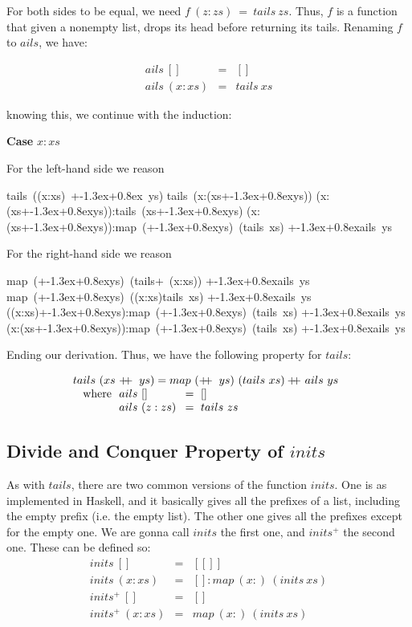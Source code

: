 \documentclass[twoside]{article}
\newcommand\concat{+\kern-1.3ex+\kern0.8ex}
\begin{document}
For both sides to be equal, we need $f~(z:zs)~=~tails~zs$. Thus, $f$ is a
function that given a nonempty list, drops its head before returning its tails.
Renaming $f$ to $ails$, we have:

\[
\begin{array}{lcl}
  ails~[]    & = & [] \\
  ails~(x:xs)& = & tails~xs
\end{array}
\]

knowing this, we continue with the induction:

\textbf{Case} $x:xs$

For the left-hand side we reason
\begin{calculation}
  tails~((x:xs)~\concat~ys)
  \step{definition of $\concat$}
  tails~(x:(xs\concat ys))
  (x:(xs\concat ys)):tails~(xs\concat ys)
  (x:(xs\concat ys)):map~(\concat ys)~(tails~xs) \concat ails~ys
\end{calculation}

For the right-hand side we reason
\begin{calculation}
  map~(\concat ys)~(tails+~(x:xs)) \concat ails~ys
  map~(\concat ys)~((x:xs)tails~xs) \concat ails~ys
((x:xs)\concat ys):map~(\concat ys)~(tails~xs) \concat ails~ys
\step{definition of $\concat$}
(x:(xs\concat ys)):map~(\concat ys)~(tails~xs) \concat ails~ys
\end{calculation}

Ending our derivation. Thus, we have the following property for $tails$:

\[
  \begin{array}{@{}l@{}l@{}l@{}l}
    ta&ils~(xs~&\concat ys)=ma&p~(\concat ys)~(tails~xs) \concat ails~ys\\
      &\text{where } &ails~[]~&=~[]\\
      &              &ails~(z:zs)~&=~tails~zs
\end{array}
\]


\subsection{Divide and Conquer Property of $inits$}
As with $tails$, there are two common versions of the function $inits$. One is
as implemented in Haskell, and it basically gives all the prefixes of a list,
including the empty prefix (i.e. the empty list). The other one gives all the
prefixes except for the empty one. We are gonna call $inits$ the first one, and
$inits^+$ the second one. These can be defined so:
\[
\begin{array}{lll}
  inits~[]    &=& [[]] \\
  inits~(x:xs)&=& []:map~(x:)~(inits~xs)\\
  inits^+~[]    &=& [] \\
  inits^+~(x:xs)&=& map~(x:)~(inits~xs)
\end{array}
\]
\end{document}
